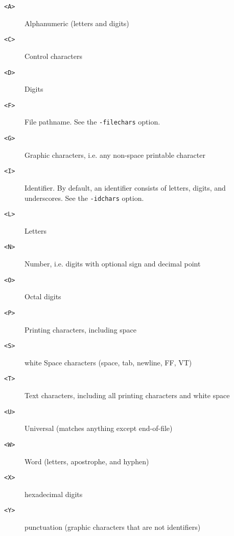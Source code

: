 \begin{description}
\item[{\tt <A>}]
Alphanumeric (letters and digits)
\item[{\tt <C>}]
Control characters
\item[{\tt <D>}]
Digits
\item[{\tt <F>}]
File pathname.  See the \verb/-filechars/ option.
\item[{\tt <G>}]
Graphic characters, i.e. any non-space printable character
\item[{\tt <I>}]
Identifier.  By default, an identifier consists of letters, digits, and
underscores.  See the \verb/-idchars/ option.
\item[{\tt <L>}]
Letters
\item[{\tt <N>}]
Number, i.e. digits with optional sign and decimal point
\item[{\tt <O>}]
Octal digits
\item[{\tt <P>}]
Printing characters, including space
\item[{\tt <S>}]
white Space characters (space, tab, newline, FF, VT)
\item[{\tt <T>}]
Text characters, including all printing characters and white space
\item[{\tt <U>}]
Universal (matches anything except end-of-file)
\item[{\tt <W>}]
Word (letters, apostrophe, and hyphen)
\item[{\tt <X>}]
hexadecimal digits
\item[{\tt <Y>}]
punctuation (graphic characters that are not identifiers)
\end{description}
